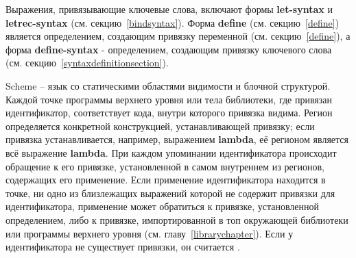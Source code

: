 Выражения, привязывающие ключевые слова, включают формы {\cf\bfseries let-syntax} и
{\cf\bfseries letrec-syntax} (см. секцию~\ref{bindsyntax}). Форма {\cf\bfseries define}
(см. секцию~\ref{define}) является определением, создающим привязку переменной
(см. секцию~\ref{define}), а форма {\cf\bfseries define-syntax} - определением, создающим
привязку ключевого слова (см. секцию~\ref{syntaxdefinitionsection}).

\vest Scheme -- язык со статическими областями видимости и блочной структурой. Каждой точке
программы верхнего уровня или тела библиотеки, где привязан идентификатор, соответствует
 кода, внутри которого привязка видима. Регион определяется конкретной
конструкцией, устанавливающей привязку; если привязка устанавливается, например, выражением
{\cf\bfseries lambda}, её регионом является всё выражение {\cf\bfseries lambda}. При каждом
упоминании идентификатора происходит обращение к его привязке, установленной в самом внутреннем
из регионов, содержащих его применение. Если применение идентификатора находится в точке,
ни одно из близлежащих выражений которой не содержит привязки для идентификатора, применение может
обратиться к привязке, установленной определением, либо к привязке, импортированной в топ окружающей
библиотеки или программы верхнего уровня (см. главу~\ref {librarychapter}). Если у
идентификатора не существует привязки, он считается .

